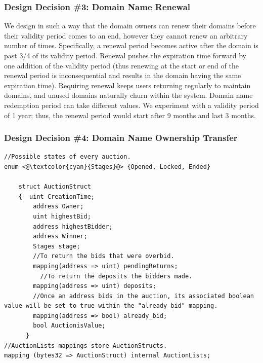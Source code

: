 \subsubsection[Domain Name Renewal]{Design Decision \#3: Domain Name Renewal}

We design \Ghazalstar in such a way that the domain owners can renew their domains before their validity period comes to an end, however they cannot renew an arbitrary number of times. Specifically, a renewal period becomes active after the domain is past 3/4 of its validity period. Renewal pushes the expiration time forward by one addition of the validity period (thus renewing at the start or end of the renewal period is inconsequential and results in the domain having the same expiration time). Requiring renewal keeps users returning regularly to maintain domains, and unused domains naturally churn within the system. Domain name redemption period can take different values. We experiment with a validity period of 1 year; thus, the renewal period would start after 9 months and last 3 months. 

\subsubsection[Ownership Transfer]{Design Decision \#4: Domain Name Ownership Transfer}
\label{sec:revocation}

\begin{lstlisting}[basicstyle=\scriptsize\ttfamily,caption={Implementation of AuctionStruct and AuctionLists mapping in \Ghazalstar smart contract.},label={code:auction},float]
//Possible states of every auction.
enum <@\textcolor{cyan}{Stages}@> {Opened, Locked, Ended} 
   
    struct AuctionStruct  
    {  uint CreationTime;  
        address Owner;    
        uint highestBid;    
        address highestBidder;  
        address Winner;   
        Stages stage;           
        //To return the bids that were overbid.
        mapping(address => uint) pendingReturns;   
	      //To return the deposits the bidders made. 
        mapping(address => uint) deposits;      
        //Once an address bids in the auction, its associated boolean value will be set to true within the "already_bid" mapping.
        mapping(address => bool) already_bid;      
        bool AuctionisValue;                        
      }
//AuctionLists mappings store AuctionStructs.
mapping (bytes32 => AuctionStruct) internal AuctionLists;
\end{lstlisting}

